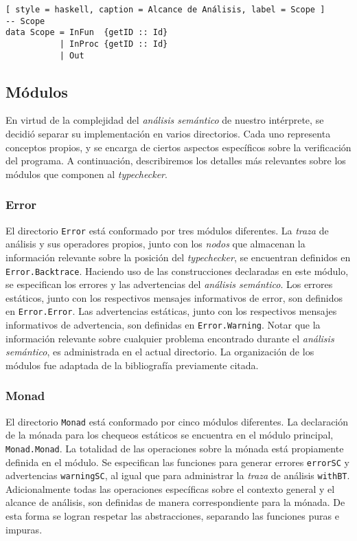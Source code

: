 \begin{lstlisting}[ style = haskell, caption = Alcance de Análisis, label = Scope ]
-- Scope
data Scope = InFun  {getID :: Id}
           | InProc {getID :: Id}
           | Out
\end{lstlisting}


\subsection{Módulos}

En virtud de la complejidad del \textit{análisis semántico} de nuestro intérprete, se decidió separar su implementación en varios directorios.
Cada uno representa conceptos propios, y se encarga de ciertos aspectos específicos sobre la verificación del programa.
A continuación, describiremos los detalles más relevantes sobre los módulos que componen al \textit{typechecker}.

\subsubsection{Error}

El directorio \lstinline[style = module]{Error} está conformado por tres módulos diferentes.
La \textit{traza} de análisis y sus operadores propios, junto con los \textit{nodos} que almacenan la información relevante sobre la posición del \textit{typechecker}, se encuentran definidos en \lstinline[style = module]{Error.Backtrace}.
Haciendo uso de las construcciones declaradas en este módulo, se especifican los errores y las advertencias del \textit{análisis semántico}.
Los errores estáticos, junto con los respectivos mensajes informativos de error, son definidos en \lstinline[style = module]{Error.Error}.
Las advertencias estáticas, junto con los respectivos mensajes informativos de advertencia, son definidas en \lstinline[style = module]{Error.Warning}.
Notar que la información relevante sobre cualquier problema encontrado durante el \textit{análisis semántico}, es administrada en el actual directorio.
La organización de los módulos fue adaptada de la bibliografía previamente citada.

\subsubsection{Monad}

El directorio \lstinline[style = module]{Monad} está conformado por cinco módulos diferentes.
La declaración de la mónada para los chequeos estáticos se encuentra en el módulo principal, \lstinline[style = module]{Monad.Monad}.
La totalidad de las operaciones sobre la mónada está propiamente definida en el módulo.
Se especifican las funciones para generar errores \lstinline[style = haskell]{errorSC} y advertencias \lstinline[style = haskell]{warningSC}, al igual que para administrar la \textit{traza} de análisis \lstinline[style = haskell]{withBT}.
Adicionalmente todas las operaciones específicas sobre el contexto general y el alcance de análisis, son definidas de manera correspondiente para la mónada.
De esta forma se logran respetar las abstracciones, separando las funciones puras e impuras.

